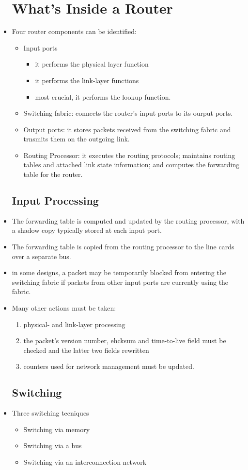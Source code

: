 \documentclass{article}
\begin{document}
\begin{itemize}
\section{What's Inside a Router}
\item Four router components can be identified:
\begin{itemize}
\item Input ports
\begin{itemize}
\item it performs the physical layer function
\item it performs the link-layer functions
\item most crucial, it performs the lookup function.
\end{itemize}
\item Switching fabric: connects the router's input ports to its
  ourput ports.
\item Output ports: it stores packets received from the switching
  fabric and trnsmits them on the outgoing link.
\item Routing Processor: it executes the routing protocols; maintains
  routing tables and attached link state information; and computes the
  forwarding table for the router.
\end{itemize}
\subsection{Input Processing}
\item The forwarding table is computed and updated by the routing
  processor, with a shadow copy typically stored at each input port.
\item The forwarding table is copied from the routing processor to the
  line cards over a separate bus.
\item in some designs, a packet may be temporarily blocked from
  entering the switching fabric if packets from other input ports are
  currently using the fabric.
\item Many other actions must be taken:
\begin{enumerate}
\item physical- and link-layer processing
\item the packet's version number, ehcksum and time-to-live field must
  be checked and the latter two fields rewritten
\item counters used for network management must be updated.
\end{enumerate}
\subsection{Switching}
\item Three switching tecniques
\begin{itemize}
\item Switching via memory
\item Switching via a bus
\item Switching via an interconnection network
\end{itemize}

\end{itemize}
\end{document}
